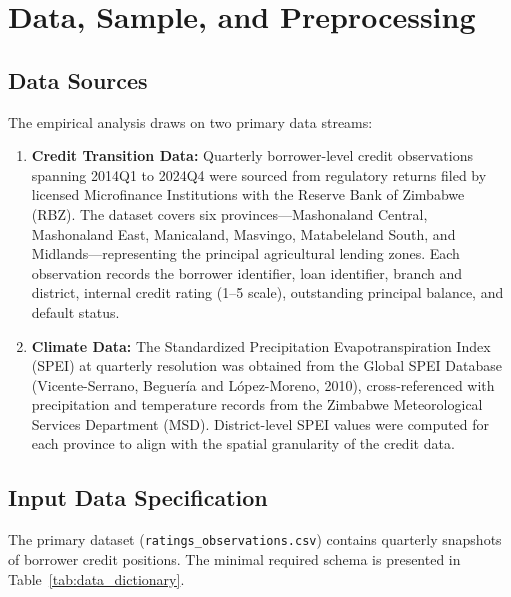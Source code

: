 \documentclass[12pt,a4paper]{article}
\begin{document}
\section{Data, Sample, and Preprocessing}

\subsection{Data Sources}

The empirical analysis draws on two primary data streams:

\begin{enumerate}[noitemsep]
    \item \textbf{Credit Transition Data:} Quarterly borrower-level credit observations spanning 2014Q1 to 2024Q4 were sourced from regulatory returns filed by licensed Microfinance Institutions with the Reserve Bank of Zimbabwe (RBZ). The dataset covers six provinces---Mashonaland Central, Mashonaland East, Manicaland, Masvingo, Matabeleland South, and Midlands---representing the principal agricultural lending zones. Each observation records the borrower identifier, loan identifier, branch and district, internal credit rating (1--5 scale), outstanding principal balance, and default status.
    \item \textbf{Climate Data:} The Standardized Precipitation Evapotranspiration Index (SPEI) at quarterly resolution was obtained from the Global SPEI Database (Vicente-Serrano, Beguer\'ia and L\'opez-Moreno, 2010), cross-referenced with precipitation and temperature records from the Zimbabwe Meteorological Services Department (MSD). District-level SPEI values were computed for each province to align with the spatial granularity of the credit data.
\end{enumerate}

\subsection{Input Data Specification}

The primary dataset (\texttt{ratings\_observations.csv}) contains quarterly snapshots of borrower credit positions. The minimal required schema is presented in Table~\ref{tab:data_dictionary}.
\end{document}
